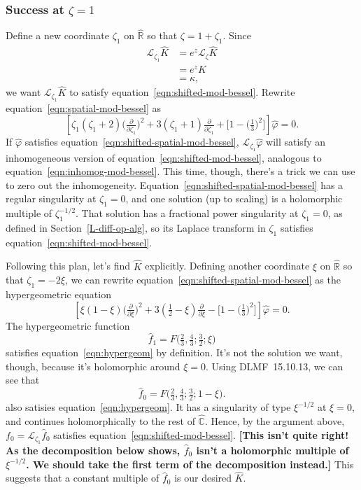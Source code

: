 \documentclass{article}
\newcommand{\R}{\mathbb{R}}
\newcommand{\C}{\mathbb{C}}
\newcommand{\laplace}{\mathcal{L}}
\begin{document}
\subsubsection{Success at $\zeta = 1$}
Define a new coordinate $\zeta_1$ on $\hat{\R}$ so that $\zeta = 1 + \zeta_1$. Since
\begin{align*}
\laplace_{\zeta_1} \hat{K} & = e^z \laplace_\zeta \hat{K} \\
& = e^z K \\
& = \kappa,
\end{align*}
we want $\laplace_{\zeta_1} \hat{K}$ to satisfy equation~\ref{eqn:shifted-mod-bessel}. Rewrite equation~\ref{eqn:spatial-mod-bessel} as
\begin{equation}\label{eqn:shifted-spatial-mod-bessel}
\left[\zeta_1(\zeta_1 + 2) \big(\tfrac{\partial}{\partial \zeta_1}\big)^2 + 3(\zeta_1 + 1) \tfrac{\partial}{\partial \zeta_1} + \big[1 - \big(\tfrac{1}{3}\big)^2\big]\right] \hat{\varphi} = 0.
\end{equation}
If $\hat{\varphi}$ satisfies equation~\ref{eqn:shifted-spatial-mod-bessel}, $\laplace_{\zeta_1} \hat{\varphi}$ will satisfy an inhomogeneous version of equation~\ref{eqn:shifted-mod-bessel}, analogous to equation~\ref{eqn:inhomog-mod-bessel}. This time, though, there's a trick we can use to zero out the inhomogeneity. Equation~\ref{eqn:shifted-spatial-mod-bessel} has a regular singularity at $\zeta_1 = 0$, and one solution (up to scaling) is a holomorphic multiple of $\zeta_1^{-1/2}$. That solution has a fractional power singularity at $\zeta_1 = 0$, as defined in Section~\ref{L-diff-op-alg}, so its Laplace transform in $\zeta_1$ satisfies equation~\ref{eqn:shifted-mod-bessel}.

Following this plan, let's find $\hat{K}$ explicitly. Defining another coordinate $\xi$ on $\hat{\R}$ so that $\zeta_1 = -2\xi$, we can rewrite equation~\ref{eqn:shifted-spatial-mod-bessel} as the hypergeometric equation
\begin{equation}\label{eqn:hypergeom}
\left[\xi(1 - \xi) \big(\tfrac{\partial}{\partial \xi}\big)^2 + 3(\tfrac{1}{2} - \xi) \tfrac{\partial}{\partial \xi} - \big[1 - \big(\tfrac{1}{3}\big)^2\big]\right] \hat{\varphi} = 0.
\end{equation}
The hypergeometric function
\[ \hat{f}_1 = F\big(\tfrac{2}{3}, \tfrac{4}{3}; \tfrac{3}{2}; \xi\big) \]
satisfies equation~\ref{eqn:hypergeom} by definition. It's not the solution we want, though, because it's holomorphic around $\xi = 0$. Using DLMF~15.10.13, we can see that
\[ \hat{f}_0 = F\big(\tfrac{2}{3}, \tfrac{4}{3}; \tfrac{3}{2}; 1-\xi\big). \]
also satisies equation~\ref{eqn:hypergeom}. It has a singularity of type $\xi^{-1/2}$ at $\xi = 0$, and continues holomorphically to the rest of $\hat{\C}$. Hence, by the argument above, $f_0 = \laplace_{\zeta_1} \hat{f}_0$ satisfies equation~\ref{eqn:shifted-mod-bessel}. \textbf{[This isn't quite right! As the decomposition below shows, $\hat{f}_0$ isn't a holomorphic multiple of $\xi^{-1/2}$. We should take the first term of the decomposition instead.]} This suggests that a constant multiple of $\hat{f}_0$ is our desired $\hat{K}$.
\end{document}
